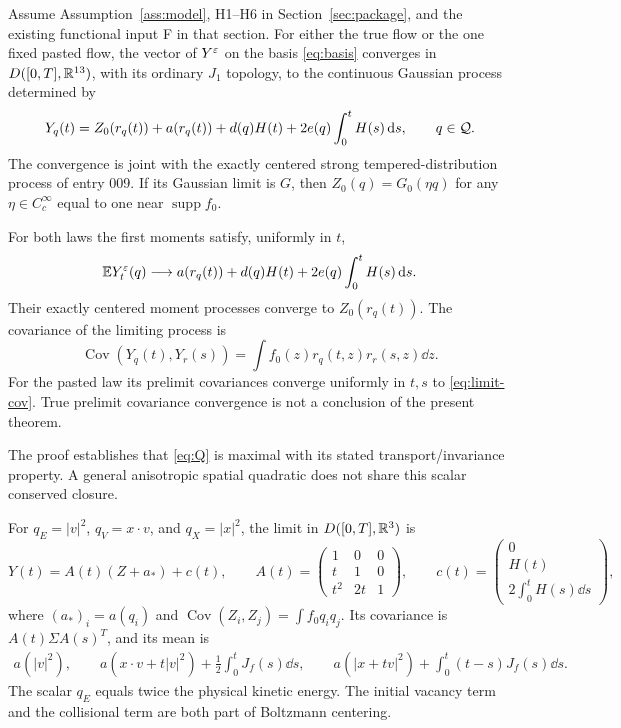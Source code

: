 \begin{theorem}\label{thm:main}
Assume Assumption~\ref{ass:model}, H1--H6 in Section~\ref{sec:package}, and
the existing functional input F in that section. For either the true flow
or the one fixed pasted flow, the vector of $Y^\varepsilon$ on the basis
\eqref{eq:basis} converges in $D([0,T],\mathbb R^{13})$, with its ordinary $J_1$
topology, to the continuous Gaussian process determined by
\begin{equation}\label{eq:main-limit}
 Y_q(t)=Z_0(r_q(t))+a(r_q(t))
                +d(q)H(t)+2e(q)\int_0^tH(s)\,\mathrm d s,\qquad q\in\mathcal Q.
\end{equation}
The convergence is joint with the exactly centered strong tempered-distribution
process of entry 009. If its Gaussian limit is $G$, then
$Z_0(q)=G_0(\eta q)$ for any $\eta\in C_c^\infty$ equal to one near
$\operatorname{supp}f_0$.

For both laws the first moments satisfy, uniformly in $t$,
\begin{equation}\label{eq:mean-limit}
 \mathbb E Y_t^\varepsilon(q)\longrightarrow
 a(r_q(t))+d(q)H(t)+2e(q)\int_0^tH(s)\,\mathrm d s.
\end{equation}
Their exactly centered moment processes converge to $Z_0(r_q(t))$.
The covariance of the limiting process is
\begin{equation}\label{eq:limit-cov}
 \operatorname{Cov}(Y_q(t),Y_r(s))
                    =\int f_0(z)r_q(t,z)r_r(s,z)\dd z.
\end{equation}
For the pasted law its prelimit covariances converge uniformly in $t,s$
to \eqref{eq:limit-cov}. True prelimit covariance convergence is not a
conclusion of the present theorem.
\end{theorem}

The proof establishes that \eqref{eq:Q} is maximal with its stated
transport/invariance property. A general anisotropic spatial quadratic does
not share this scalar conserved closure.

\begin{corollary}\label{cor:three}
For $q_E=|v|^2$, $q_V=x\cdot v$, and $q_X=|x|^2$, the limit in
$D([0,T],\mathbb R^3)$ is
\begin{equation}\label{eq:three-limit}
 Y(t)=A(t)(Z+a_*)+c(t),\qquad
 A(t)=\begin{pmatrix}1&0&0\\t&1&0\\t^2&2t&1\end{pmatrix},\qquad
 c(t)=\begin{pmatrix}0\\H(t)\\2\int_0^tH(s)\dd s\end{pmatrix},
\end{equation}
where $(a_*)_i=a(q_i)$ and $\operatorname{Cov}(Z_i,Z_j)=\int f_0q_iq_j$.
Its covariance is $A(t)\Sigma A(s)^T$, and its mean is
\begin{align*}
 a(|v|^2),\qquad
 a(x\cdot v+t|v|^2)+\frac12\int_0^tJ_f(s)\dd s,\qquad
 a(|x+tv|^2)+\int_0^t(t-s)J_f(s)\dd s.
\end{align*}
The scalar $q_E$ equals twice the physical kinetic energy. The initial
vacancy term and the collisional term are both part of Boltzmann centering.
\end{corollary}
